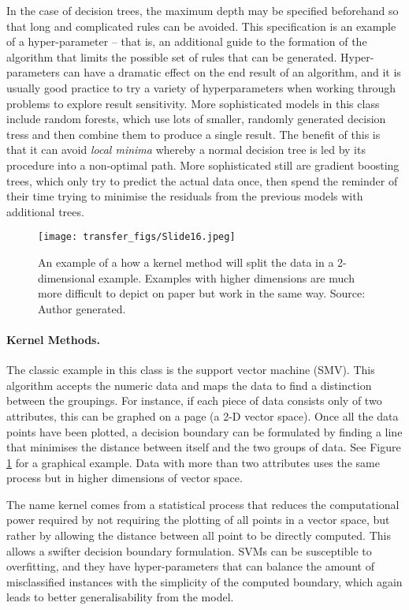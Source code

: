 In the case of decision trees, the maximum depth may be specified beforehand so that long and complicated rules can be avoided. This specification is an example of a hyper-parameter – that is, an additional guide to the formation of the algorithm that limits the possible set of rules that can be generated. Hyper-parameters can have a dramatic effect on the end result of an algorithm, and it is usually good practice to try a variety of hyperparameters when working through problems to explore result sensitivity. More sophisticated models in this class include random forests, which use lots of smaller, randomly generated decision tress and then combine them to produce a single result. The benefit of this is that it can avoid  \emph{local minima} whereby a normal decision tree is led by its procedure into a non-optimal path. More sophisticated still are gradient boosting trees, which only try to predict the actual data once, then spend the reminder of their time trying to minimise the residuals from the previous models with additional trees.

\begin{figure}
  \texttt{[image: transfer\_figs/Slide16.jpeg]}
  \caption[Kernel Methods Example.]{An example of a how a kernel method will split the data in a 2-dimensional example. Examples with higher dimensions are much more difficult to depict on paper but work in the same way.  Source: Author generated.}
  \label{fig:svm}
\end{figure}

\paragraph{Kernel Methods.} The classic example in this class is the support vector machine (SMV). This algorithm accepts the numeric data and maps the data to find a distinction between the groupings. For instance, if each piece of data consists only of two attributes, this can be graphed on a page (a 2-D vector space). Once all the data points have been plotted, a decision boundary can be formulated by finding a line that minimises the distance between itself and the two groups of data. See Figure \ref{fig:svm} for a graphical example. Data with more than two attributes uses the same process but in higher dimensions of vector space.

The name kernel comes from a statistical process that reduces the computational power required by not requiring the plotting of all points in a vector space, but rather by allowing the distance between all point to be directly computed. This allows a swifter decision boundary formulation. SVMs can be susceptible to overfitting, and they have hyper-parameters that can balance the amount of misclassified instances with the simplicity of the computed boundary, which again leads to better generalisability from the model. 

